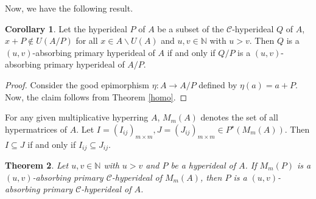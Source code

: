 \documentclass[preprint,review,10pt]{amsart}
\newtheorem{theorem}{Theorem}[section]
\theoremstyle{definition}
\newtheorem{corollary}[theorem]{Corollary}
\theoremstyle{remark}
\numberwithin{equation}{section}
\begin{document}
Now, we have the following result.
\begin{corollary}
Let the hyperideal $P$ of $A$ be a subset of the $\mathcal{C}$-hyperideal $Q$ of $A$, $x+P \notin U(A/P)$ for all $x \in A \backslash U(A)$ and $u,v \in \mathbb{N}$ with $u>v$. Then $Q$ is a $(u,v)$-absorbing primary hyperideal of $A$ if and only if $Q/P$ is a $(u,v)$-absorbing primary hyperideal of $A/P$.
\end{corollary}
\begin{proof}
Consider the good epimorphism $\eta :A \longrightarrow A/P$ defined by $\eta(a)=a+P$. Now,  the claim follows from Theorem \ref{homo}. 
\end{proof}
For any given multiplicative hyperring $A$,  $M_m(A)$ denotes the set of all hypermatrices of $A$. Let $I = (I_{ij})_{m \times m}, J = (J_{ij})_{m \times m} \in P^\star (M_m(A))$. Then $I \subseteq J$ if and only if $I_{ij} \subseteq J_{ij}$\cite{ameri}. 
\begin{theorem} \label{8} 
Let $u,v \in \mathbb{N}$ with $u >v$ and $P$ be a hyperideal of $A$. If $M_m(P)$ is a $(u,v)$-absorbing primary $\mathcal{C}$-hyperideal of $M_m(A)$, then $P$ is a $(u,v)$-absorbing primary $\mathcal{C}$-hyperideal of $A$. 
\end{theorem}
\end{document}
